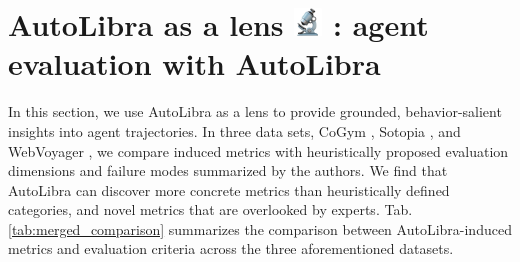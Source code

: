 \section{\texorpdfstring{AutoLibra as a lens
\includegraphics[height=1em]{figs/microscope.png}
: agent evaluation with AutoLibra}{AutoLibra as a lens: agent evaluation with AutoLibra}}
\label{sec:lens}

In this section, we use AutoLibra as a lens to provide grounded, behavior-salient
insights into agent trajectories. In three data sets, CoGym \citep{shao2024collaborative},
Sotopia \citep{zhousotopia}, and WebVoyager \citep{he2024webvoyager}, we compare
induced metrics with heuristically proposed evaluation dimensions and failure modes
summarized by the authors. We find that AutoLibra can discover more concrete
metrics than heuristically defined categories, and novel metrics that are overlooked
by experts. Tab. \ref{tab:merged_comparison} summarizes the comparison between AutoLibra-induced
metrics and evaluation criteria across the three aforementioned datasets.


